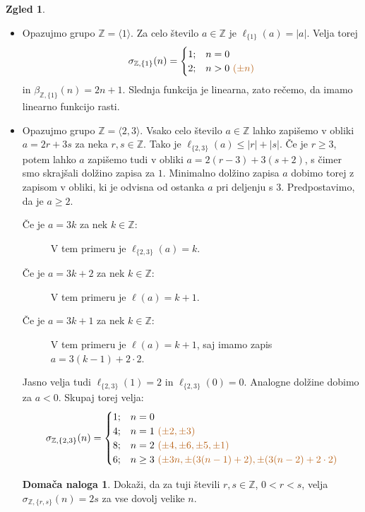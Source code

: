 \documentclass[11pt]{book}
\def\ZZ{\mathbb{Z}}
\def\vprasanje{\color{oranzna}}
\theoremstyle{definition}
\theoremstyle{zgled}
\newtheorem*{zgled}{Zgled}
\theoremstyle{odprtproblem}
\theoremstyle{domacanaloga}
\newtheorem*{domacanaloga}{Domača naloga}
\theoremstyle{izrek}
\begin{document}
\begin{zgled}
\begin{itemize}
    \item Opazujmo grupo $\ZZ = \langle 1 \rangle$. Za celo število $a \in \ZZ$ je $\ell_{\{ 1 \}}(a) = |a|$. Velja torej
    \[
    \sigma_{\ZZ, \{ 1 \}}(n) = \begin{cases} 1; & n = 0 \\ 2; & n > 0 {\vprasanje \ (\pm n)} \end{cases}
    \]
    in $\beta_{\ZZ, \{ 1 \}}(n) = 2n+1$. Slednja funkcija je linearna, zato rečemo, da imamo {\vprasanje linearno funkcijo rasti}.

    \item Opazujmo grupo $\ZZ = \langle 2,3 \rangle$. Vsako celo število $a \in \ZZ$ lahko zapišemo v obliki $a = 2r + 3s$ za neka $r,s \in \ZZ$. Tako je $\ell_{\{ 2,3 \}}(a) \leq |r| + |s|$. Če je $r \geq 3$, potem lahko $a$ zapišemo tudi v obliki $a = 2(r-3) + 3(s+2)$, s čimer smo skrajšali dolžino zapisa za $1$. Minimalno dolžino zapisa $a$ dobimo torej z zapisom v obliki, ki je odvisna od ostanka $a$ pri deljenju s $3$. Predpostavimo, da je $a \geq 2$.
    \begin{description}
        \item[Če je $a = 3k$ za nek $k \in \ZZ$:] V tem primeru je $\ell_{\{ 2,3 \}}(a) = k$.

        \item[Če je $a = 3k + 2$ za nek $k \in \ZZ$:] V tem primeru je $\ell(a) = k + 1$.

        \item[Če je $a = 3k + 1$ za nek $k \in \ZZ$:] V tem primeru je $\ell(a) = k + 1$, saj imamo zapis $a = 3(k-1) + 2 \cdot 2$.
    \end{description}
    Jasno velja tudi $\ell_{\{ 2, 3 \}}(1) = 2$ in $\ell_{\{ 2, 3 \}}(0) = 0$. Analogne dolžine dobimo za $a < 0$. Skupaj torej velja:
    \[
    \sigma_{\ZZ, \{ 2,3\}}(n) = \begin{cases}
    1; & n = 0 \\
    4; & n = 1 {\vprasanje \ (\pm 2, \pm 3)} \\
    8; & n = 2 {\vprasanje \ (\pm 4, \pm 6, \pm 5, \pm 1)} \\
    6; & n \geq 3 {\vprasanje \ (\pm 3n, \pm(3(n-1)+2), \pm(3(n-2)+2 \cdot 2)}
    \end{cases}
    \]
    \begin{domacanaloga}
    Dokaži, da za tuji števili $r,s \in \ZZ$, $0 < r < s$, velja $\sigma_{\ZZ, \{ r,s \}}(n) = 2s$ za vse dovolj velike $n$.
    \end{domacanaloga}


\end{itemize}
\end{zgled}
\end{document}

